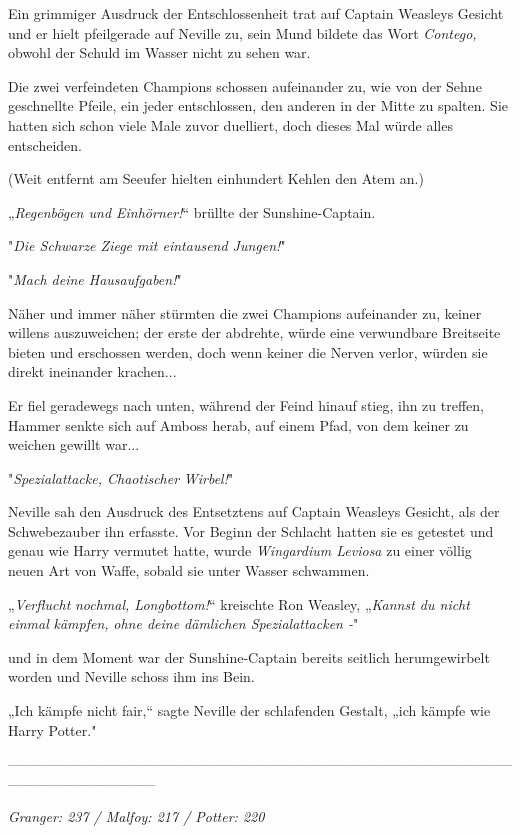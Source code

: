 {Ein grimmiger Ausdruck der Entschlossenheit trat auf Captain Weasleys Gesicht und er hielt pfeilgerade auf Neville zu, sein Mund bildete das Wort \emph{Contego,} obwohl der Schuld im Wasser nicht zu sehen war.

Die zwei verfeindeten Champions schossen aufeinander zu, wie von der Sehne geschnellte Pfeile, ein jeder entschlossen, den anderen in der Mitte zu spalten. Sie hatten sich schon viele Male zuvor duelliert, doch dieses Mal würde alles entscheiden.

(Weit entfernt am Seeufer hielten einhundert Kehlen den Atem an.)

„\emph{Regenbögen und Einhörner!}“ brüllte der Sunshine-Captain.

"\emph{Die Schwarze Ziege mit eintausend Jungen!}"

"\emph{Mach deine Hausaufgaben!}"

Näher und immer näher stürmten die zwei Champions aufeinander zu, keiner willens auszuweichen; der erste der abdrehte, würde eine verwundbare Breitseite bieten und erschossen werden, doch wenn keiner die Nerven verlor, würden sie direkt ineinander krachen...

Er fiel geradewegs nach unten, während der Feind hinauf stieg, ihn zu treffen, Hammer senkte sich auf Amboss herab, auf einem Pfad, von dem keiner zu weichen gewillt war...

"\emph{Spezialattacke, Chaotischer} \emph{Wirbel!}"

Neville sah den Ausdruck des Entsetztens auf Captain Weasleys Gesicht, als der Schwebezauber ihn erfasste. Vor Beginn der Schlacht hatten sie es getestet und genau wie Harry vermutet hatte, wurde \emph{Wingardium Leviosa} zu einer völlig neuen Art von Waffe, sobald sie unter Wasser schwammen.

„\emph{Verflucht} \emph{nochmal, Longbottom!}“ kreischte Ron Weasley, „\emph{Kannst du nicht einmal} \emph{kämpfen,} \emph{ohne deine dämlichen Spezialattacken -}"

und in dem Moment war der Sunshine-Captain bereits seitlich herumgewirbelt worden und Neville schoss ihm ins Bein.

„Ich kämpfe nicht fair,“ sagte Neville der schlafenden Gestalt, „ich kämpfe wie Harry Potter."

--------------------------------------------------------------------------------------------------------------------------------------------

\hfill\break \emph{Granger: 237 / Malfoy: 217 / Potter: 220}

}
